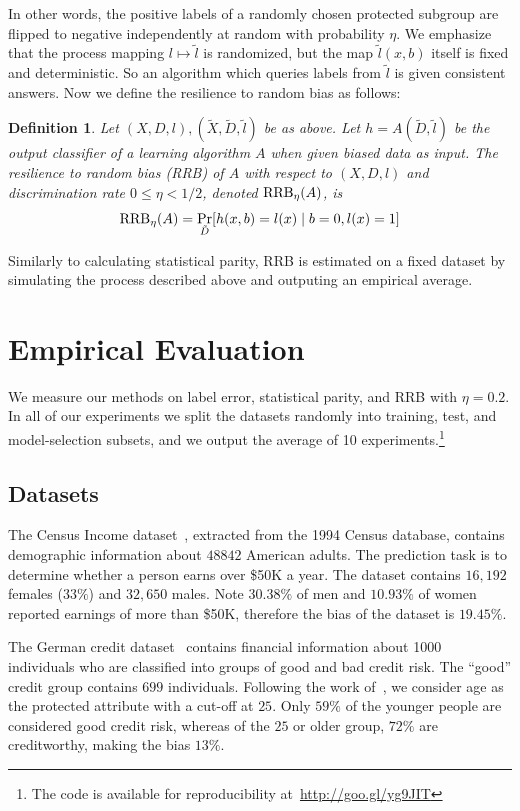 \documentclass[twoside,leqno,twocolumn]{article}
\newtheorem{definition}{Definition}
\begin{document}
In other words, the positive labels of a randomly chosen protected subgroup are
flipped to negative independently at random with probability $\eta$. We
emphasize that the process mapping $l \mapsto \tilde l$ is randomized, but the
map $\tilde l(x,b)$ itself is fixed and deterministic. So an algorithm which
queries labels from $\tilde l$ is given consistent answers. Now we define the
resilience to random bias as follows:

\begin{definition} \label{def:rrb}
Let $(X,D,l), (\tilde X, \tilde D, \tilde l)$ be as above. Let $h = A(\tilde D,
\tilde l)$ be the output classifier of a learning algorithm $A$ when given
biased data as input. The \emph{resilience to random bias} (RRB) of $A$ with
respect to $(X,D,l)$ and discrimination rate $0 \leq \eta < 1/2$, denoted
$\textup{RRB}_{\eta}(A)$, is
$$
\textup{RRB}_{\eta}(A) = \Pr_{\tilde D} [h(x,b) = l(x) \mid b = 0, l(x) = 1]
$$
\end{definition}

Similarly to calculating statistical parity, RRB is estimated on a fixed
dataset by simulating the process described above and outputing an empirical
average. 

\section{Empirical Evaluation} \label{sec:experiments}

We measure our methods on label error, statistical parity, and RRB with $\eta =
0.2$. In all of our experiments we split the datasets randomly into training,
test, and model-selection subsets, and we output the average of 10
experiments.\footnote{The code is available for reproducibility
at~\url{http://goo.gl/yg9JIT}}

\subsection{Datasets}

The Census Income dataset~\cite{Lichman13}, extracted from the 1994 Census
database, contains demographic information about $48842$ American adults.  The
prediction task is to determine whether a person earns over \$50K a year.  The
dataset contains $16,192$ females ($33\%$) and $32,650$ males. Note $30.38\%$
of men and $10.93\%$ of women reported earnings of more than \$50K, therefore
the bias of the dataset is $19.45\%$.  

The German credit dataset~\cite{Lichman13} contains financial information about
1000 individuals who are classified into groups of good and bad credit risk.
The ``good'' credit group contains $699$ individuals. Following the work
of~\cite{KamiranC09}, we consider age as the protected attribute with a cut-off
at $25$. Only $59\%$ of the younger people are considered good credit risk,
whereas of the $25$ or older group, $72\%$ are creditworthy, making the bias
$13\%$.
\end{document}
